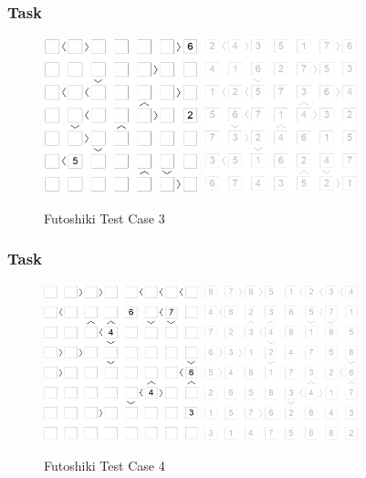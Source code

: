 \documentclass{beamer}
\begin{document}
\begin{frame}    \frametitle{Task}
        \begin{figure}[htbp]
    \centering
    \includegraphics[width=4.5cm]{Pic/f3}
    \qquad
    \includegraphics[width=4.5cm]{Pic/f3s}
    \caption{Futoshiki Test Case 3}
    \label{fig:case33}
  \end{figure}
\end{frame}
\begin{frame}    \frametitle{Task}
        \begin{figure}[htbp]
    \centering
    \includegraphics[width=4.5cm]{Pic/f4}
    \qquad
    \includegraphics[width=4.5cm]{Pic/f4s}
    \caption{Futoshiki Test Case 4}
    \label{fig:case44}
  \end{figure}
\end{frame}
\end{document}
